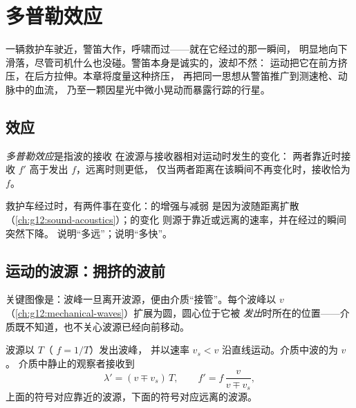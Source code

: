 \chapter{多普勒效应}\label{ch:g12:doppler-effect}

一辆救护车驶近，警笛大作，呼啸而过——就在它经过的那一瞬间，
明显地向下滑落，尽管司机什么也没碰。警笛本身是诚实的，波却不然：
运动把它在前方挤压，在后方拉伸。本章将度量这种挤压，
再把同一思想从警笛推广到测速枪、动脉中的血流，
乃至一颗因星光中微小晃动而暴露行踪的行星。

\section{效应}

\begin{definition}[多普勒效应]\label{def:g12:doppler-effect:doppler}
\emph{多普勒效应}是指波的接收
在波源与接收器相对运动时发生的变化：
两者靠近时接收 $f'$ 高于发出 $f$，远离时则更低，
仅当两者距离在该瞬间不再变化时，接收恰为 $f$。
\end{definition}

\begin{remark}[音调而非响度]\label{rem:g12:doppler-effect:pitch}
救护车经过时，有两件事在变化：\emph{}的增强与减弱
是因为波随距离扩散（\cref{ch:g12:sound-acoustics}）；\emph{}的变化
则源于靠近或远离的速率，并在经过的瞬间突然下降。
说明“多远”；说明“多快”。
\end{remark}

\section{运动的波源：拥挤的波前}

关键图像是：波峰一旦离开波源，便由介质“接管”。每个波峰以 $v$
（\cref{ch:g12:mechanical-waves}）扩展为圆，圆心位于它被
\emph{发出}时所在的位置——介质既不知道，也不关心波源已经向前移动。

\begin{proposition}[运动的波源]\label{prop:g12:doppler-effect:moving-source}
波源以 $T$（ $f = 1/T$）发出波峰，
并以速率 $v_s < v$ 沿直线运动。介质中波的为 $v$。
介质中静止的观察者接收到
\[
\lambda' = (v \mp v_s)\,T, \qquad f' = f\,\frac{v}{v \mp v_s},
\]
上面的符号对应靠近的波源，下面的符号对应远离的波源。
\end{proposition}

